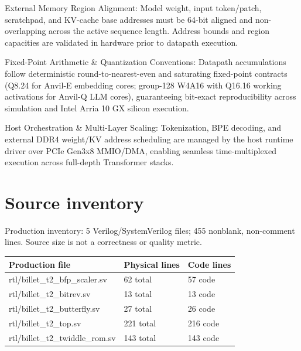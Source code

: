 \documentclass[11pt,a4paper]{article}
\begin{document}
External Memory Region Alignment: Model weight,\allowbreak{} input token/\allowbreak{}patch,\allowbreak{} scratchpad,\allowbreak{} and KV-cache base addresses must be 64-bit aligned and non-overlapping across the active sequence length. Address bounds and region capacities are validated in hardware prior to datapath execution.


Fixed-Point Arithmetic \& Quantization Conventions: Datapath accumulations follow deterministic round-to-nearest-even and saturating fixed-point contracts (\allowbreak{}Q8.24 for Anvil-E embedding cores; group-128 W4A16 with Q16.16 working activations for Anvil-Q LLM cores)\allowbreak{},\allowbreak{} guaranteeing bit-exact reproducibility across simulation and Intel Arria 10 GX silicon execution.


Host Orchestration \& Multi-Layer Scaling: Tokenization,\allowbreak{} BPE decoding,\allowbreak{} and external DDR4 weight/\allowbreak{}KV address scheduling are managed by the host runtime driver over PCIe Gen3x8 MMIO/\allowbreak{}DMA,\allowbreak{} enabling seamless time-multiplexed execution across full-depth Transformer stacks.


\appendix{}\section{Source inventory}

Production inventory: 5 Verilog/\allowbreak{}SystemVerilog files; 455 nonblank,\allowbreak{} non-comment lines. Source size is not a correctness or quality metric.

{\small\renewcommand{\arraystretch}{1.18}\begin{longtable}{@{}L{0.55\textwidth}|L{0.18\textwidth}|L{0.18\textwidth}@{}}\toprule

\textbf{Production file} & \textbf{Physical lines} & \textbf{Code lines}\\\midrule\endhead

rtl/\allowbreak{}billet\_\allowbreak{}t2\_\allowbreak{}bfp\_\allowbreak{}scaler.sv & 62 total & 57 code\\[2pt]\hline

rtl/\allowbreak{}billet\_\allowbreak{}t2\_\allowbreak{}bitrev.sv & 13 total & 13 code\\[2pt]\hline

rtl/\allowbreak{}billet\_\allowbreak{}t2\_\allowbreak{}butterfly.sv & 27 total & 26 code\\[2pt]\hline

rtl/\allowbreak{}billet\_\allowbreak{}t2\_\allowbreak{}top.sv & 221 total & 216 code\\[2pt]\hline

rtl/\allowbreak{}billet\_\allowbreak{}t2\_\allowbreak{}twiddle\_\allowbreak{}rom.sv & 143 total & 143 code\\[2pt]\hline

\bottomrule\end{longtable}}
\end{document}
